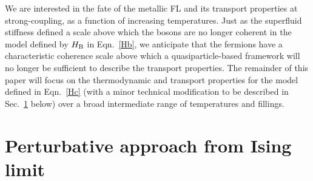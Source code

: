 \documentclass[aps,prx,onecolumn,amsmath,nofootinbib,amssymb,11pt]{revtex4-1}
\def \tn {\textnormal}
\def \hb {H_{\tn{B}}}
\begin{document}
We are interested in the fate of the metallic FL and its transport properties at strong-coupling, as a function of increasing temperatures. Just as the superfluid stiffness defined a scale above which the bosons are no longer coherent in the model defined by $\hb$ in Eqn.~\ref{Hb}, we anticipate that the fermions have a characteristic coherence scale above which a quasiparticle-based framework will no longer be sufficient to describe the transport properties. The remainder of this paper will focus on the thermodynamic and transport properties for the model defined in Eqn.~\ref{Hc} (with a minor technical modification to be described in Sec.~\ref{subsec:pert} below) over a broad intermediate range of temperatures and fillings.  


\section{\textsf{Perturbative approach from Ising limit}}
\label{subsec:pert}
\end{document}
